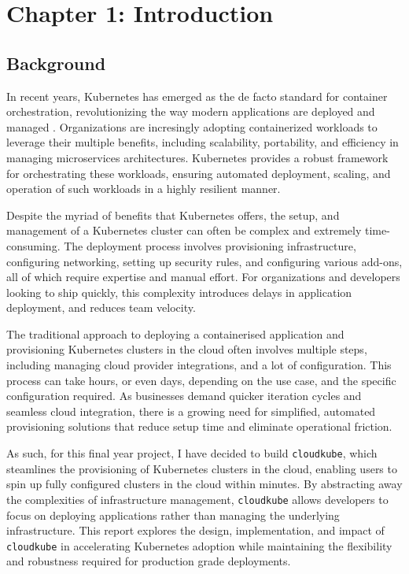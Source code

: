 \chapter{Chapter 1: Introduction}
\section{Background}
In recent years, Kubernetes has emerged as the de facto standard for container orchestration, revolutionizing the way modern applications are deployed and managed \cite{google-no-date}. 
Organizations are incresingly adopting containerized workloads to leverage their multiple benefits, including scalability, portability, and efficiency in managing microservices architectures.
Kubernetes provides a robust framework for orchestrating these workloads, ensuring automated deployment, scaling, and operation of such workloads in a highly resilient manner. 

Despite the myriad of benefits that Kubernetes offers, the setup, and management of a Kubernetes cluster can often be complex and extremely time-consuming. The deployment
process involves provisioning infrastructure, configuring networking, setting up security rules, and configuring various add-ons, all of which require expertise and manual effort. For 
organizations and developers looking to ship quickly, this complexity introduces delays in application deployment, and reduces team velocity.

The traditional approach to deploying a containerised application and provisioning Kubernetes clusters in the cloud often involves multiple steps, including managing cloud provider integrations, and 
a lot of configuration. This process can take hours, or even days, depending on the use case, and the specific configuration required. As businesses demand quicker iteration cycles and seamless
cloud integration, there is a growing need for simplified, automated provisioning solutions that reduce setup time and eliminate operational friction.

As such, for this final year project, I have decided to build \texttt{cloudkube}, which steamlines the provisioning of Kubernetes clusters in the cloud, enabling users to spin up fully
configured clusters in the cloud within minutes. By abstracting away the complexities of infrastructure management, \texttt{cloudkube} allows developers to focus on deploying applications rather 
than managing the underlying infrastructure. This report explores the design, implementation, and impact of \texttt{cloudkube} in accelerating Kubernetes adoption while maintaining the flexibility
and robustness required for production grade deployments.




